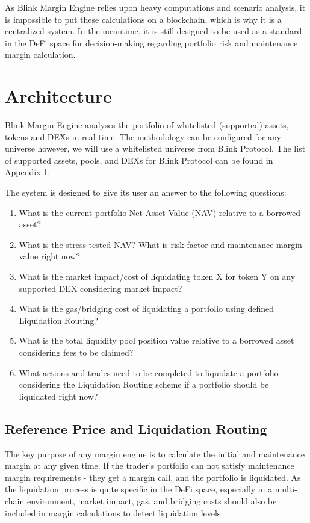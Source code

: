 \documentclass[letterpaper, 12pt]{article}
\begin{document}
As Blink Margin Engine relies upon heavy computations and scenario analysis, it is impossible to put these calculations on a blockchain, which is why it is a centralized system. In the meantime, it is still designed to be used as a standard in the DeFi space for decision-making regarding portfolio risk and maintenance margin calculation. 

\section {Architecture}

Blink Margin Engine analyses the portfolio of whitelisted (supported) assets, tokens and DEXs in real time. 
The methodology can be configured for any universe however, we will use a whitelisted universe from Blink Protocol. The list of supported assets, pools, and DEXs for Blink Protocol can be found in Appendix 1.

The system is designed to give its user an answer to the following questions:
  \begin{enumerate}
  \item What is the current portfolio Net Asset Value (NAV) relative to a borrowed asset?
  \item What is the stress-tested NAV? What is risk-factor and maintenance margin value right now?
  \item What is the market impact/cost of liquidating token X for token Y on any supported DEX considering market impact?
  \item What is the gas/bridging cost of liquidating a portfolio using defined Liquidation Routing?
  \item What is the total liquidity pool position value relative to a borrowed asset considering fees to be claimed?
  \item What actions and trades need to be completed to liquidate a portfolio considering the Liquidation Routing scheme if a portfolio should be liquidated right now?
  \end{enumerate}


\subsection{Reference Price and Liquidation Routing}
The key purpose of any margin engine is to calculate the initial and maintenance margin at any given time. If the trader's portfolio can not satisfy maintenance margin requirements -  they get a margin call, and the portfolio is liquidated. As the liquidation process is quite specific in the DeFi space, especially in a multi-chain environment, market impact, gas, and bridging costs should also be included in margin calculations to detect liquidation levels.
\end{document}
